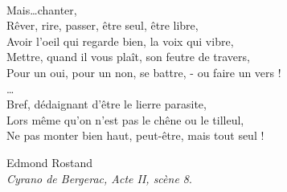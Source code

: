 
\cleardoublepage
\thispagestyle{empty}
\begin{fullwidth}
%
~\vspace{10\baselineskip}

\hfill
\begin{minipage}{10cm}
    {\nohyphenation\noindent%
        Mais\dots chanter,\\
        Rêver, rire, passer, être seul, être libre,\\
        Avoir l'oeil qui regarde bien, la voix qui vibre,\\
        Mettre, quand il vous plaît, son feutre de travers,\\
        Pour un oui, pour un non, se battre, - ou faire un vers !\\
        \dots\\
        Bref, dédaignant d’être le lierre parasite,\\
        Lors même qu’on n’est pas le chêne ou le tilleul,\\
        Ne pas monter bien haut, peut-être, mais tout seul !\\[10pt]
        \begin{flushright}
        {\large\color{myblue}%
            Edmond Rostand\\
            {\itshape Cyrano de Bergerac, Acte II, scène 8}.
        }
        \end{flushright}
    }
\end{minipage}


\end{fullwidth}